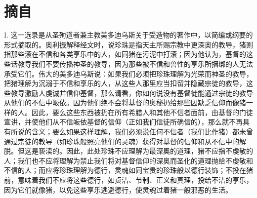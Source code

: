
\section{摘自}

I. 这一选录是从圣殉道者兼主教美多迪乌斯关于受造物的著作中，以简编或纲要的形式摘取的。奥利振解释经文时，说珍珠是指天主所赐宗教中更深奥的教导，猪则指那些滚在不信和各类享乐中的人，如同猪在污泥中打滚；因为他认为，基督的这些话教导我们不要传播神圣的教导，因为那些被不信和兽性的享乐所捆绑的人无法承受它们。伟大的美多迪乌斯说：如果我们必须把珍珠理解为光荣而神圣的教导，把猪理解为沉溺于不信和享乐的人，从这些人那里应当扣留并隐藏宗徒的教导，这些教导激励人虔诚并信仰基督，那么请看，你如何说没有基督徒能通过宗徒的教导从他们的不信中皈依。因为他们绝不会将基督的奥秘扔给那些因缺乏信仰而像猪一样的人。因此，要么这些东西被扔在所有希腊人和其他不信者面前，由基督的门徒宣讲，并使他们从不信皈依基督的信仰（正如我们信徒所确信的），那么就不再具有所说的含义；要么如果这样理解，我们必须说任何不信者（我们比作猪）都未曾通过宗徒的教导（如珍珠般照亮他们的灵魂）获得对基督的信仰和从不信中的解脱。但这是亵渎的。因此，此处珍珠不应理解为最深奧的道理，猪不应指不虔敬的人；我们也不应将理解为禁止我们将对基督信仰的深奥而圣化的道理抛给不虔敬和不信的人；而应将珍珠理解为德行，灵魂如同宝贵的珍珠般以德行装饰；不投在猪前，意味着我们不应将这些德行，如贞洁、节制、正义和真理，投给不洁的享乐，因为它们就像猪，以免这些享乐逃避德行，使灵魂过着猪一般邪恶的生活。\par

